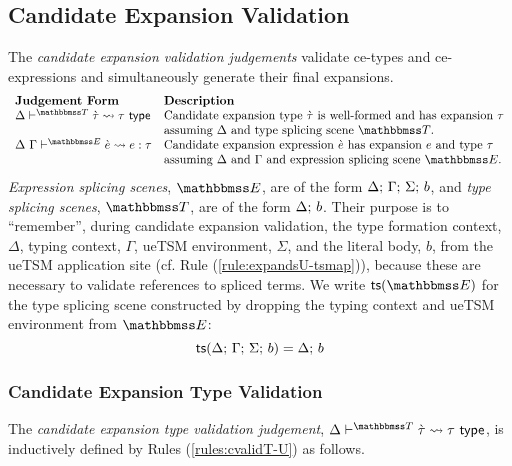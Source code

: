 \subsection{Candidate Expansion Validation}\label{sec:ce-validation-U}
The \emph{candidate expansion validation judgements} validate ce-types and ce-expressions and simultaneously generate their final expansions.%
\[\begin{array}{ll}
\textbf{Judgement Form} & \textbf{Description}\\
\cvalidT{\Delta}{\tscenev}{\ctau}{\tau} & \text{Candidate expansion type $\ctau$ is well-formed and has expansion $\tau$}\\
& \text{assuming $\Delta$ and type splicing scene $\tscenev$.}\\
\cvalidE{\Delta}{\Gamma}{\escenev}{\ce}{e}{\tau} & \text{Candidate expansion expression $\ce$ has expansion $e$ and type $\tau$}\\
& \text{assuming $\Delta$ and $\Gamma$ and expression splicing scene $\escenev$.}
\end{array}\]
\emph{Expression splicing scenes}, $\escenev$, are of the form $\Delta;\,\Gamma;\,\Sigma;\,b$, and \emph{type splicing scenes}, $\tscenev$, are of the form $\Delta;\,b$. Their purpose is to ``remember'', during candidate expansion validation, the type formation context, $\Delta$, typing context, $\Gamma$, ueTSM environment, $\Sigma$, and the literal body, $b$, from the ueTSM application site (cf. Rule (\ref{rule:expandsU-tsmap})), because these are necessary to validate references to spliced terms. We write $\tsfrom{\escenev}$ for the type splicing scene constructed by dropping the typing context and ueTSM environment from $\escenev$:
\[\mathsf{ts}(\Delta;\,\Gamma;\,\Sigma;\,b) = \Delta;\,b\]

\subsubsection{Candidate Expansion Type Validation}
The \emph{candidate expansion type validation judgement}, $\cvalidT{\Delta}{\tscenev}{\ctau}{\tau}$, is inductively defined by Rules (\ref*{rules:cvalidT-U}) as follows.

